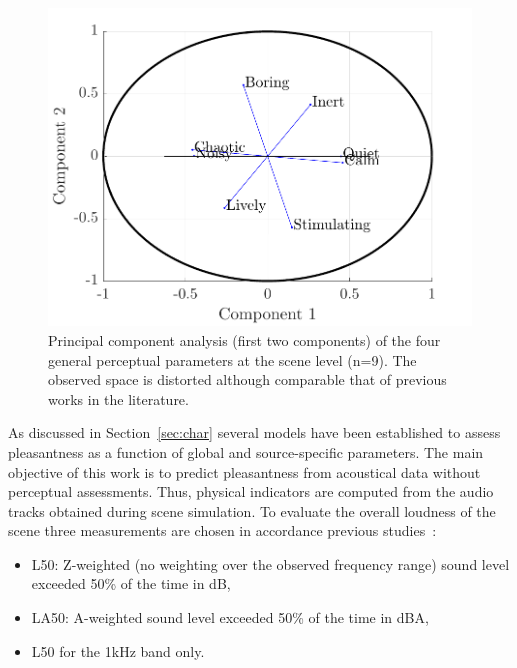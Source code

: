 \documentclass{article}
\begin{document}
\begin{sloppy}
\begin{figure}[t]
  \centering
  \centerline{\includegraphics[width=\columnwidth]{pca.pdf}}
  \caption{Principal component analysis (first two components) of the four general perceptual parameters at the scene level (n=9). The observed space is distorted although comparable that of previous works in the literature.}
  \label{fig:pca}
\end{figure}

As discussed in Section~\ref{sec:char} several models have been established to assess pleasantness as a function of global and source-specific parameters. The main objective of this work is to predict pleasantness from acoustical data without perceptual assessments. Thus, physical indicators are computed from the audio tracks obtained during scene simulation. To evaluate the overall loudness of the scene three measurements are chosen in accordance previous studies~\cite{decoensel2006, ricciardi2014, aumond2017}:
\begin{itemize}
\item L50: Z-weighted (no weighting over the observed frequency range) sound level exceeded 50\% of the time in dB,
\item LA50: A-weighted sound level exceeded 50\% of the time in dBA,
\item L50 for the 1kHz band only.
\end{itemize}



\end{sloppy}
\end{document}
